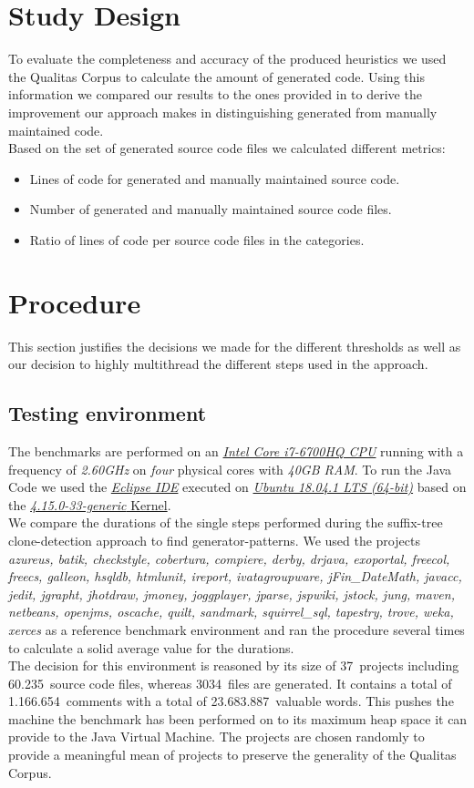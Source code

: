 \section{Study Design}
To evaluate the completeness and accuracy of the produced heuristics we used the Qualitas Corpus to calculate the amount of generated code. Using this information we compared our results to the ones provided in \cite{Bernwieser2014} to derive the improvement our approach makes in distinguishing generated from manually maintained code.\\
Based on the set of generated source code files we calculated different metrics:
\begin{itemize}
	\item Lines of code for generated and manually maintained source code.
	\item Number of generated and manually maintained source code files.
	\item Ratio of lines of code per source code files in the categories.
\end{itemize}

\section{Procedure}
This section justifies the decisions we made for the different thresholds as well as our decision to highly multithread the different steps used in the approach.

\subsection{Testing environment}
The benchmarks are performed on an \href{https://www.intel.de/}{\textit{Intel Core i7-6700HQ CPU}} running with a frequency of \textit{2.60GHz} on \textit{four} physical cores with \textit{40GB RAM}. To run the Java Code we used the \href{https://www.eclipse.org/}{\textit{Eclipse IDE}} executed on \href{https://www.ubuntu.com/}{\textit{Ubuntu 18.04.1 LTS (64-bit)}} based on the \href{https://www.ubuntu.com/}{\textit{4.15.0-33-generic} Kernel}.\\
We compare the durations of the single steps performed during the suffix-tree clone-detection approach to find generator-patterns. We used the projects \textit{azureus, batik, checkstyle, cobertura, compiere, derby, drjava, exoportal, freecol, freecs, galleon, hsqldb, htmlunit, ireport, ivatagroupware, jFin\_DateMath, javacc, jedit, jgrapht, jhotdraw, jmoney, joggplayer, jparse, jspwiki, jstock, jung, maven, netbeans, openjms, oscache, quilt, sandmark, squirrel\_sql, tapestry, trove, weka, xerces} as a reference benchmark environment and ran the procedure several times to calculate a solid average value for the durations. \\
The decision for this environment is reasoned by its size of 37~projects including 60.235~source code files, whereas 3034~files are generated. It contains a total of 1.166.654~comments with a total of 23.683.887~valuable words. This pushes the machine the benchmark has been performed on to its maximum heap space it can provide to the Java Virtual Machine. The projects are chosen randomly to provide a meaningful mean of projects to preserve the generality of the Qualitas Corpus.

